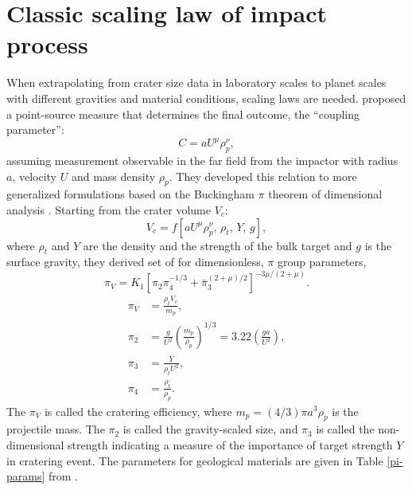\documentclass[3p,authoryear]{elsarticle}
\begin{document}
 \appendix
\section{Classic scaling law of impact process}\label{sec:piscaling}
When extrapolating from crater size data in laboratory scales to planet scales with different gravities and material conditions, scaling laws are needed.
\citet{holsapple1987} proposed a point-source measure that determines the final outcome, the ``coupling parameter'':
\begin{equation}
	C=aU^\mu\rho_p^\nu,
\end{equation}
assuming measurement observable in the far field from the impactor with radius $a$, velocity $U$ and mass density $\rho_p$.
They developed this relation to more generalized formulations based on the Buckingham $\pi$ theorem of dimensional analysis \citep{buckingham1914}.
Starting from the crater volume $V_c$:
\begin{equation}
	V_c=f[aU^\mu\rho_p^\nu,\, \rho_t,\,Y,\, g], \label{pi-start-eq}
\end{equation}
where $\rho_t$ and $Y$ are the density and the strength of the bulk target and $g$ is the surface gravity, they derived set of for dimensionless, $\pi$ group parameters,
\begin{equation}
	\pi_V=K_1\left[\pi_2\pi_4^{-1/3}+\bar{\pi}_3^{(2+\mu)/2}\right]^{-3\mu/(2+\mu)}.\label{simple-pi}
 \end{equation}
\begin{align}
	\pi_V&=\frac{\rho_t V_c}{m_p}, \label{piV}\\
	\pi_2&=\frac{g}{U^2}\left(\frac{m_p}{\rho_p}\right)^{1/3}=3.22\left(\frac{ga}{U^2}\right),\\
	\pi_3&=\frac{\bar{Y}}{\rho_tU^2}, \label{pi3}\\
	\pi_4&=\frac{\rho_t}{\rho_p}.
\end{align}
The $\pi_V$ is called the cratering efficiency, where $m_p=(4/3)\pi a^3\rho_p$ is the projectile mass.
The $\pi_2$ is called the gravity-scaled size, and $\pi_3$ is called the non-dimensional strength indicating a measure of the importance of target strength $Y$ in cratering event.
 The parameters for geological materials are given in Table \ref{pi-params} from \citet{holsapple1993}.
\end{document}
